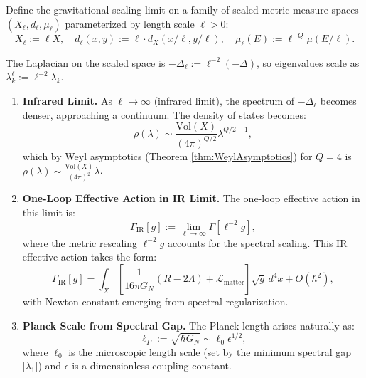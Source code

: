 \begin{theorem}
\label{thm:scalingLimitGravity}

Define the gravitational scaling limit on a family of scaled metric measure spaces $(X_\ell, d_\ell, \mu_\ell)$ parameterized by length scale $\ell > 0$:
\begin{equation}
X_\ell := \ell X, \quad d_\ell(x, y) := \ell \cdot d_X(x/\ell, y/\ell), \quad \mu_\ell(E) := \ell^{-Q} \mu(E/\ell).
\end{equation}

The Laplacian on the scaled space is $-\Delta_\ell := \ell^{-2} (-\Delta)$, so eigenvalues scale as $\lambda_k^\ell := \ell^{-2} \lambda_k$.

\begin{enumerate}[label=(\roman*)]

\item \textbf{Infrared Limit.} As $\ell \to \infty$ (infrared limit), the spectrum of $-\Delta_\ell$ becomes denser, approaching a continuum. The density of states becomes:
\begin{equation}
\rho(\lambda) \sim \frac{\text{Vol}(X)}{(4\pi)^{Q/2}} \lambda^{Q/2 - 1},
\end{equation}
which by Weyl asymptotics (Theorem \ref{thm:WeylAsymptotics}) for $Q = 4$ is $\rho(\lambda) \sim \frac{\text{Vol}(X)}{(4\pi)^2} \lambda$.

\item \textbf{One-Loop Effective Action in IR Limit.} The one-loop effective action in this limit is:
\begin{equation}
\Gamma_{\text{IR}}[g] := \lim_{\ell \to \infty} \Gamma[\ell^{-2}g],
\end{equation}
where the metric rescaling $\ell^{-2}g$ accounts for the spectral scaling. This IR effective action takes the form:
\begin{equation}
\Gamma_{\text{IR}}[g] = \int_X \left[\frac{1}{16\pi G_N} (R - 2\Lambda) + \mathcal{L}_{\text{matter}}\right] \sqrt{g} \, d^4x + O(\hbar^2),
\end{equation}
with Newton constant emerging from spectral regularization.

\item \textbf{Planck Scale from Spectral Gap.} The Planck length arises naturally as:
\begin{equation}
\ell_P := \sqrt{\hbar G_N} \sim \ell_0 \epsilon^{1/2},
\end{equation}
where $\ell_0$ is the microscopic length scale (set by the minimum spectral gap $|\lambda_1|$) and $\epsilon$ is a dimensionless coupling constant.


\end{enumerate}
\end{theorem}
